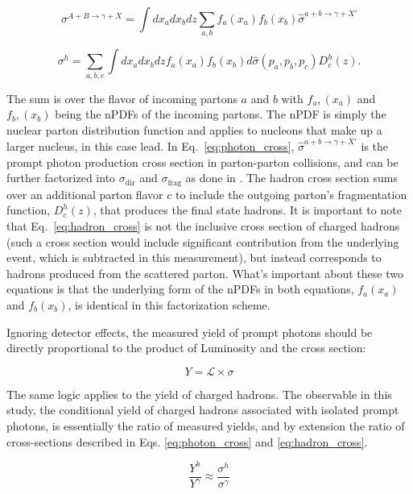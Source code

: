 \begin{equation}
  \sigma^{A+B\rightarrow\gamma+X} = \int dx_a dx_b dz \sum_{a,b}f_{a}(x_a)f_{b}(x_b) \hat{\sigma}^{a+b\rightarrow\gamma+X'}
\end{equation}
\label{eq:photon_cross}

\begin{equation}
  \sigma^h= \sum_{a,b,c} \int dx_a dx_b dz f_a(x_a) f_b(x_b) d\hat{\sigma}(p_a,p_b,p_c) D_c^h(z).
  \label{eq:hadron_cross}
\end{equation}

The sum is over the flavor of incoming partons $a$ and  $b$ with $f_{a},(x_a)$ and  $f_{b},(x_b)$ being the nPDFs of the incoming partons. The nPDF is simply the nuclear parton distribution function and applies to nucleons that make up a larger nucleus, in this case lead. In Eq.~\ref{eq:photon_cross}, $\hat{\sigma}^{a+b\rightarrow\gamma+X'}$ is the prompt photon production cross section in parton-parton collisions, and can be further factorized into $\sigma_\mathrm{dir}$ and $\sigma_\mathrm{frag}$ as done in \cite{williams2018}. The hadron cross section sums over an additional parton flavor $c$ to include the outgoing parton's fragmentation function, $D_c^h(z)$, that produces the final state hadrons. It is important to note that Eq.~\ref{eq:hadron_cross} is not the inclusive cross section of charged hadrons (such a cross section would include significant contribution from the underlying event, which is subtracted in this measurement), but instead corresponds to hadrons produced from the scattered parton. What's important about these two equations is that the underlying form of the nPDFs in both equations, $f_{a}(x_a)$ and $f_{b}(x_b)$, is identical in this factorization scheme. 

Ignoring detector effects, the measured yield of prompt photons should be directly proportional to the product of Luminosity and the cross section:

\begin{equation}
  Y = \mathcal{L}\times\sigma
\end{equation}

The same logic applies to the yield of charged hadrons. The observable in this study, the conditional yield of charged hadrons associated with isolated prompt photons, is essentially the ratio of measured yields, and by extension the ratio of cross-sections described in Eqs. \ref{eq:photon_cross} and \ref{eq:hadron_cross}. 

\begin{equation}
  \frac{Y^h}{Y^\gamma} \approx \frac{\sigma^h}{\sigma^\gamma}
  \label{eq:yield_ratios}
\end{equation}

